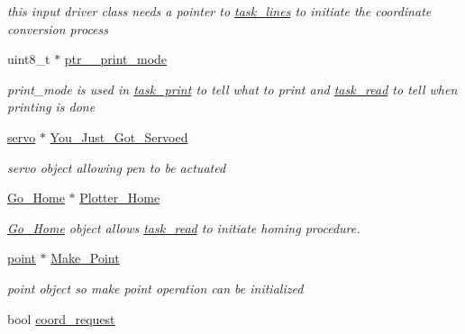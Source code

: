 \begin{DoxyCompactItemize}
\begin{DoxyCompactList}\small\item\em this input driver class needs a pointer to \hyperlink{classtask__lines}{task\-\_\-lines} to initiate the coordinate conversion process \end{DoxyCompactList}\item 
\hypertarget{classtask__read_a3b091755eb7191a9335849186fe0182d}{uint8\-\_\-t $\ast$ \hyperlink{classtask__read_a3b091755eb7191a9335849186fe0182d}{ptr\-\_\-\_\-print\-\_\-mode}}\label{classtask__read_a3b091755eb7191a9335849186fe0182d}

\begin{DoxyCompactList}\small\item\em print\-\_\-mode is used in \hyperlink{classtask__print}{task\-\_\-print} to tell what to print and \hyperlink{classtask__read}{task\-\_\-read} to tell when printing is done \end{DoxyCompactList}\item 
\hypertarget{classtask__read_aa7e34e9247996ada93680d9d8a487d5f}{\hyperlink{classservo}{servo} $\ast$ \hyperlink{classtask__read_aa7e34e9247996ada93680d9d8a487d5f}{You\-\_\-\-Just\-\_\-\-Got\-\_\-\-Servoed}}\label{classtask__read_aa7e34e9247996ada93680d9d8a487d5f}

\begin{DoxyCompactList}\small\item\em servo object allowing pen to be actuated \end{DoxyCompactList}\item 
\hypertarget{classtask__read_a0b170938e3179e2d810ea7f95ae37a75}{\hyperlink{classGo__Home}{Go\-\_\-\-Home} $\ast$ \hyperlink{classtask__read_a0b170938e3179e2d810ea7f95ae37a75}{Plotter\-\_\-\-Home}}\label{classtask__read_a0b170938e3179e2d810ea7f95ae37a75}

\begin{DoxyCompactList}\small\item\em \hyperlink{classGo__Home}{Go\-\_\-\-Home} object allows \hyperlink{classtask__read}{task\-\_\-read} to initiate homing procedure. \end{DoxyCompactList}\item 
\hypertarget{classtask__read_a9493b50784b9d5077ed9a8994fb1e58d}{\hyperlink{classpoint}{point} $\ast$ \hyperlink{classtask__read_a9493b50784b9d5077ed9a8994fb1e58d}{Make\-\_\-\-Point}}\label{classtask__read_a9493b50784b9d5077ed9a8994fb1e58d}

\begin{DoxyCompactList}\small\item\em point object so make point operation can be initialized \end{DoxyCompactList}\item 
\hypertarget{classtask__read_af36241d1d2487fb0c42e9c7d5d4ad42b}{bool \hyperlink{classtask__read_af36241d1d2487fb0c42e9c7d5d4ad42b}{coord\-\_\-request}}\label{classtask__read_af36241d1d2487fb0c42e9c7d5d4ad42b}


\end{DoxyCompactItemize}
